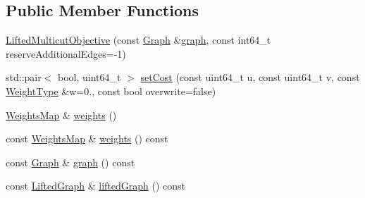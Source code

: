 \subsection*{Public Member Functions}
\begin{DoxyCompactItemize}
\item 
\hyperlink{classnifty_1_1graph_1_1optimization_1_1lifted__multicut_1_1LiftedMulticutObjective_a789584d42dd3a5f9ffc95e0b1c76fd96}{Lifted\+Multicut\+Objective} (const \hyperlink{classnifty_1_1graph_1_1optimization_1_1lifted__multicut_1_1LiftedMulticutObjective_ad424be985627898c8af930ebc7c776f9}{Graph} \&\hyperlink{classnifty_1_1graph_1_1optimization_1_1lifted__multicut_1_1LiftedMulticutObjective_a2940992d6ee8d4c516f8795f8a718c9b}{graph}, const int64\+\_\+t reserve\+Additional\+Edges=-\/1)
\item 
std\+::pair$<$ bool, uint64\+\_\+t $>$ \hyperlink{classnifty_1_1graph_1_1optimization_1_1lifted__multicut_1_1LiftedMulticutObjective_a560c0a7ac6cbed8635a94cd34a8dee01}{set\+Cost} (const uint64\+\_\+t u, const uint64\+\_\+t v, const \hyperlink{classnifty_1_1graph_1_1optimization_1_1lifted__multicut_1_1LiftedMulticutObjective_a0046f0b75a777244b728f103a53087a0}{Weight\+Type} \&w=0., const bool overwrite=false)
\item 
\hyperlink{classnifty_1_1graph_1_1optimization_1_1lifted__multicut_1_1LiftedMulticutObjective_a95340316f33714f1206080ff0e425f56}{Weights\+Map} \& \hyperlink{classnifty_1_1graph_1_1optimization_1_1lifted__multicut_1_1LiftedMulticutObjective_aca57fb104ba54676f213d4c34b349ab7}{weights} ()
\item 
const \hyperlink{classnifty_1_1graph_1_1optimization_1_1lifted__multicut_1_1LiftedMulticutObjective_a95340316f33714f1206080ff0e425f56}{Weights\+Map} \& \hyperlink{classnifty_1_1graph_1_1optimization_1_1lifted__multicut_1_1LiftedMulticutObjective_a5e2380e15760d9c575b08fcc0801dbde}{weights} () const 
\item 
const \hyperlink{classnifty_1_1graph_1_1optimization_1_1lifted__multicut_1_1LiftedMulticutObjective_ad424be985627898c8af930ebc7c776f9}{Graph} \& \hyperlink{classnifty_1_1graph_1_1optimization_1_1lifted__multicut_1_1LiftedMulticutObjective_a2940992d6ee8d4c516f8795f8a718c9b}{graph} () const 
\item 
const \hyperlink{classnifty_1_1graph_1_1optimization_1_1lifted__multicut_1_1LiftedMulticutObjective_a3d3e69a6bc8de9a85497c8e4a1620815}{Lifted\+Graph} \& \hyperlink{classnifty_1_1graph_1_1optimization_1_1lifted__multicut_1_1LiftedMulticutObjective_aec81827b58e50b8d763dfe9a9e11140a}{lifted\+Graph} () const 

\end{DoxyCompactItemize}
